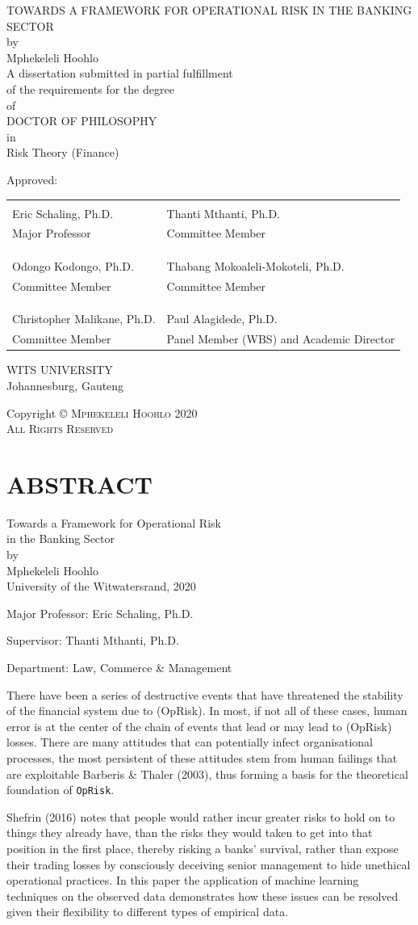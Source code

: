 \documentclass{DissertateUSU}
\renewcommand{\maketitle}{
	\thispagestyle{empty}
	\vspace*{\fill}
	\begin{center}
	\doublespaced
	\MakeUppercase{Towards a Framework for Operational Risk in the Banking Sector}\\
	by\\
	Mphekeleli Hoohlo \\
	\singlespaced
	A dissertation submitted in partial fulfillment\\
	of the requirements for the degree \\
	\doublespaced
	of\\
	\MakeUppercase{Doctor of Philosophy} \\
	in\\
	\singlespaced
  Risk Theory (Finance) \\
	\end{center}

	\vspace{20pt}
	\noindent Approved: \\
	\vspace{30pt}
	\noindent
	\begin{tabular}{ll}
    \makebox[2.75in]{\hrulefill} & \makebox[2.75in]{\hrulefill}\\
    Eric Schaling, Ph.D.                      & Thanti Mthanti, Ph.D. \\
    Major Professor              & Committee Member \\
    & \\
    & \\
    \makebox[2.75in]{\hrulefill} & \makebox[2.75in]{\hrulefill}\\
    Odongo Kodongo, Ph.D.                 & Thabang Mokoaleli-Mokoteli, Ph.D. \\
    Committee Member             & Committee Member \\
    & \\
    & \\
    \makebox[2.75in]{\hrulefill} & \makebox[2.75in]{\hrulefill}\\
    Christopher Malikane, Ph.D.                 & Paul Alagidede, Ph.D. \\
    Committee Member             & Panel Member (WBS) and Academic Director \\

    \end{tabular}

  \vspace{20pt}
    \begin{center}
	  \singlespacing
      \MakeUppercase{WITS UNIVERSITY}\\
	    Johannesburg, Gauteng\\
	    \doublespacing
	    2020
	  \end{center}
	\vspace*{\fill}
	\clearpage
}
\newcommand{\copyrightpage}{
	\vspace*{\fill}
  \begin{center}
	\doublespacing
	Copyright \hspace{3pt}
	  \scshape \small \copyright  \hspace{3pt}
	  Mphekeleli Hoohlo \hspace{3pt} 2020 \\
	All Rights Reserved
  \end{center}
	\vspace*{\fill}
}
\begin{document}
\maketitle

\pagestyle{empty}
\copyrightpage


\newpage
\pagestyle{fancy}
\fancyhead[R]{\thepage}
\fancyfoot[C]{}
\chapter*{ABSTRACT}

\doublespacing
\begin{center}
Towards a Framework for Operational Risk \\ 
in the Banking Sector \\
\vspace{12pt}
by \\
\vspace{12pt}
Mphekeleli Hoohlo \\
University of the Witwatersrand, 2020
\end{center}

\vspace{12pt}

\singlespacing

\noindent Major Professor: Eric Schaling, Ph.D.

\noindent Supervisor: Thanti Mthanti, Ph.D.

\noindent Department: Law, Commerce \& Management

\vspace{12pt}

\doublespacing

There have been a series of destructive events that have threatened the
stability of the financial system due to (OpRisk). In most, if not all
of these cases, human error is at the center of the chain of events that
lead or may lead to (OpRisk) losses. There are many attitudes that can
potentially infect organisational processes, the most persistent of
these attitudes stem from human failings that are exploitable Barberis
\& Thaler (2003), thus forming a basis for the theoretical foundation of
\texttt{OpRisk}.

Shefrin (2016) notes that people would rather incur greater risks to
hold on to things they already have, than the risks they would taken to
get into that position in the first place, thereby risking a banks'
survival, rather than expose their trading losses by consciously
deceiving senior management to hide unethical operational practices. In
this paper the application of machine learning techniques on the
observed data demonstrates how these issues can be resolved given their
flexibility to different types of empirical data.
\end{document}
